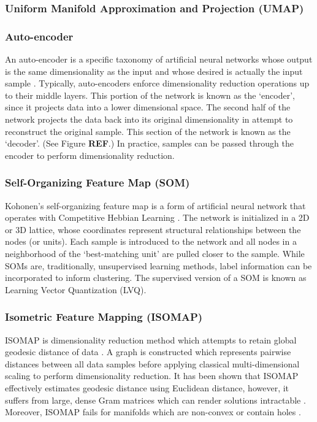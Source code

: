 \documentclass[conference]{IEEEtran}
\begin{document}
	\subsubsection*{Uniform Manifold Approximation and Projection (UMAP)}
	\subsubsection*{Auto-encoder} An auto-encoder is a specific taxonomy of artificial neural networks whose output is the same dimensionality as the input and whose desired is actually the input sample \cite{Haykin2009NeuralNetworks,Goodfellow2016DeepLearning}. Typically, auto-encoders enforce dimensionality reduction operations up to their middle layers.  This portion of the network is known as the `encoder', since it projects data into a lower dimensional space.  The second half of the network projects the data back into its original dimensionality in attempt to reconstruct the original sample.  This section of the network is known as the `decoder'. (See Figure \textbf{REF}.)  In practice, samples can be passed through the encoder to perform dimensionality reduction.
	\subsubsection*{Self-Organizing Feature Map (SOM)} Kohonen's self-organizing feature map is a form of artificial neural network that operates with Competitive Hebbian Learning \cite{Haykin2009NeuralNetworks,Kohonen1990SOM,Fritzke1995GrowingNeuralGas}.  The network is initialized in a 2D or 3D lattice, whose coordinates represent structural relationships between the nodes (or units).  Each sample is introduced to the network and all nodes in a neighborhood of the `best-matching unit' are pulled closer to the sample. While SOMs are, traditionally, unsupervised learning methods, label information can be incorporated to inform clustering.  The supervised version of a SOM  is known as Learning Vector Quantization (LVQ).
	\subsubsection*{Isometric Feature Mapping (ISOMAP)} ISOMAP is dimensionality reduction method which attempts to retain global geodesic distance of data \cite{Tenenbaum2000Isomap}.  A graph is constructed which represents pairwise distances between all data samples before  applying classical multi-dimensional scaling to perform dimensionality reduction.  It has been shown that ISOMAP effectively estimates geodesic distance using Euclidean distance, however, it suffers from large, dense Gram matrices which can render solutions intractable \cite{Thorstensen2009ManifoldThesis}.  Moreover, ISOMAP fails for manifolds which are non-convex or contain holes \cite{VanDerMaaten2009DRReview}.
\end{document}
